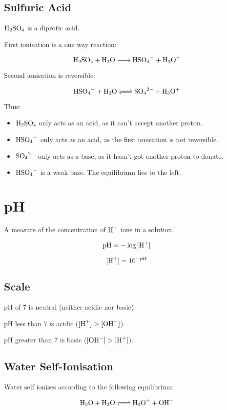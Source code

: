 \documentclass[a4paper,11pt]{article}
\begin{document}
\subsection{Sulfuric Acid}

$\ce{H2SO4}$ is a diprotic acid.

First ionisation is a one way reaction:

$$
\ce{H2SO4 + H2O -> HSO4- + H3O+}
$$

Second ionisation is reversible:

$$
\ce{HSO4- + H2O <=> SO4^2- + H3O+}
$$

Thus:

\begin{itemize}
\item $\ce{H2SO4}$ only acts as an acid, as it can't accept another proton.
\item $\ce{HSO4-}$ only acts as an acid, as the first ionisation is not
	reversible.
\item $\ce{SO4^2-}$ only acts as a base, as it hasn't got another proton to
	donate.
\item $\ce{HSO4-}$ is a weak base. The equilibrium lies to the left.
\end{itemize}


\section{pH}

A measure of the concentration of $\ce{H+}$ ions in a solution.

$$
\text{pH} = -\log{[\ce{H+}]}
$$

$$
[\ce{H+}] = 10^{-\text{pH}}
$$


\subsection{Scale}

pH of 7 is neutral (neither acidic nor basic).

pH less than 7 is acidic ($[\ce{H+}] > [\ce{OH-}]$).

pH greater than 7 is basic ($[\ce{OH-}] > [\ce{H+}]$).


\subsection{Water Self-Ionisation}

Water self ionises according to the following equilibrium:

$$
\ce{H2O + H2O <=> H3O+ + OH-}
$$
\end{document}
